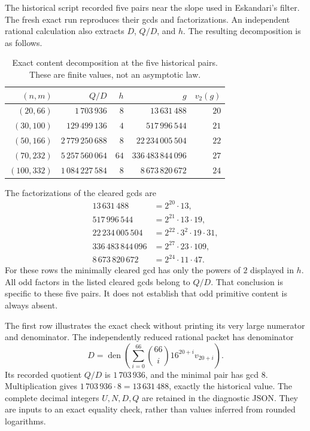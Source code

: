 The historical script recorded five pairs near the slope used in Eskandari's filter. The fresh exact run reproduces their gcds and factorizations. An independent rational calculation also extracts $D$, $Q/D$, and $h$. The resulting decomposition is as follows.

\begin{table}[htbp]
\centering\small
\begin{tabular}{@{}rrrrr@{}}
\toprule
$(n,m)$ & $Q/D$ & $h$ & $g$ & $v_2(g)$\\
\midrule
$(20,66)$ & $1\,703\,936$ & $8$ & $13\,631\,488$ & $20$\\
$(30,100)$ & $129\,499\,136$ & $4$ & $517\,996\,544$ & $21$\\
$(50,166)$ & $2\,779\,250\,688$ & $8$ & $22\,234\,005\,504$ & $22$\\
$(70,232)$ & $5\,257\,560\,064$ & $64$ & $336\,483\,844\,096$ & $27$\\
$(100,332)$ & $1\,084\,227\,584$ & $8$ & $8\,673\,820\,672$ & $24$\\
\bottomrule
\end{tabular}
\caption{Exact content decomposition at the five historical pairs. These are finite values, not an asymptotic law.}
\label{tab:content-five}
\end{table}

The factorizations of the cleared gcds are
\begin{align*}
13\,631\,488&=2^{20}\cdot13,\\
517\,996\,544&=2^{21}\cdot13\cdot19,\\
22\,234\,005\,504&=2^{22}\cdot3^2\cdot19\cdot31,\\
336\,483\,844\,096&=2^{27}\cdot23\cdot109,\\
8\,673\,820\,672&=2^{24}\cdot11\cdot47.
\end{align*}
For these rows the minimally cleared gcd has only the powers of $2$ displayed in $h$. All odd factors in the listed cleared gcds belong to $Q/D$. That conclusion is specific to these five pairs. It does not establish that odd primitive content is always absent.

The first row illustrates the exact check without printing its very large numerator and denominator. The independently reduced rational packet has denominator
\begin{equation*}
 D=\operatorname{den}\left(\sum_{i=0}^{66}\binom{66}{i}16^{20+i}v_{20+i}\right).
\end{equation*}
Its recorded quotient $Q/D$ is $1\,703\,936$, and the minimal pair has gcd $8$. Multiplication gives $1\,703\,936\cdot8=13\,631\,488$, exactly the historical value. The complete decimal integers $U,N,D,Q$ are retained in the diagnostic JSON. They are inputs to an exact equality check, rather than values inferred from rounded logarithms.

